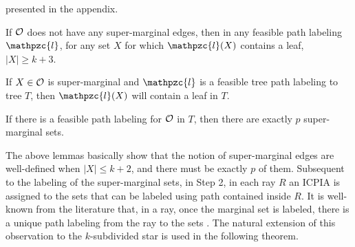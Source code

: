 \documentclass[envcountsect, envcountsame, 11pt]{../lib/llncs2e/llncs}
\def\cF{{\cal F}}
\def\cO{{\cal O}}
\def\cl{\mathpzc{l}}
\def\overlap{\between}
\begin{document}
presented in the appendix. 
\begin{lemma}
  If $\cO$ does not have any super-marginal edges, then in any
  feasible path labeling $\cl$, for any set $X$ for which $\cl(X)$ contains a leaf, $|X|
  \geq k+3$.
\end{lemma}
\begin{lemma}
  \label{lem:sup-mar}
  If $X \in \cO$ is super-marginal and $\cl$ is a feasible tree path
  labeling to tree $T$, then $\cl(X)$ will contain a leaf in $T$.
\end{lemma}
\begin{lemma}
  If there is a feasible path labeling for $\cO$ in $T$, then there
  are exactly $p$ super-marginal sets.
\end{lemma}
The above lemmas basically show that the notion of super-marginal edges are well-defined
when $|X| \leq k+2$, and there must be exactly $p$ of them.    Subsequent to the labeling of the 
super-marginal sets, in Step 2, in each ray $R$ an ICPIA is assigned to the sets that can be labeled
using path contained inside $R$.  It is well-known from the literature that, in a ray, once the marginal set is labeled, there is a unique path labeling from the ray to the sets \cite{nsnrs09,kklv10}.    The natural extension of this observation to the $k$-subdivided star is used in the following theorem.
\end{document}
